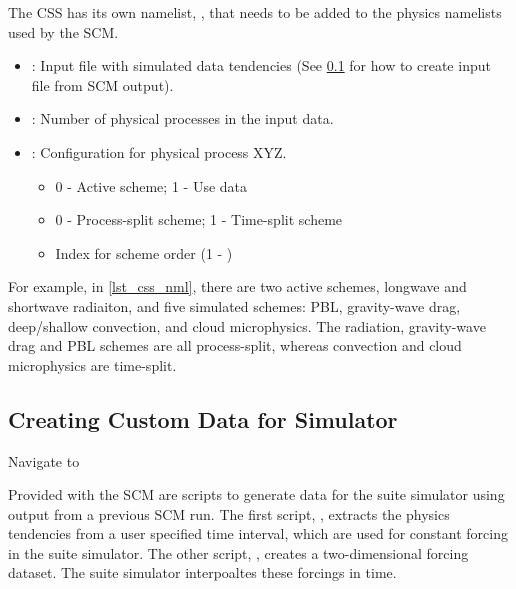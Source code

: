 The CSS has its own namelist, , that needs to be added to the physics namelists used by the SCM.



\begin{itemize}
\item {}: Input file with simulated data tendencies (See \ref{section:Creating_Custom_Data_for_Simulator} for how to create input file from SCM output).
\item {}: Number of physical processes in the input data.
\item {}: Configuration for physical process XYZ.
\begin{itemize}
\item 0 - Active scheme; 1 - Use data
\item 0 - Process-split scheme; 1 - Time-split scheme
\item Index for scheme order (1 - )
\end{itemize}
\end{itemize}

For example, in \ref{lst_css_nml}, there are two active schemes, longwave and shortwave radiaiton, and five simulated schemes: PBL, gravity-wave drag, deep/shallow convection, and cloud microphysics. The radiation, gravity-wave drag and PBL schemes are all process-split, whereas convection and cloud microphysics are time-split. 

\subsection{Creating Custom Data for Simulator}
\label{section:Creating_Custom_Data_for_Simulator}

Navigate to 

Provided with the SCM are scripts to generate data for the suite simulator using output from a previous SCM run. The first script, , extracts the physics tendencies from a user specified time interval, which are used for constant forcing in the suite simulator. The other script, , creates a two-dimensional forcing dataset. The suite simulator interpoaltes these forcings in time.

